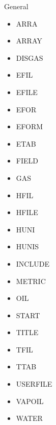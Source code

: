 \documentclass[letterpaper,10pt,english]{sphinxmanual}
\begin{document}
General
\begin{itemize}
\item {} 
ARRA

\item {} 
ARRAY

\item {} 
DISGAS

\item {} 
EFIL

\item {} 
EFILE

\item {} 
EFOR

\item {} 
EFORM

\item {} 
ETAB

\item {} 
FIELD

\item {} 
GAS

\item {} 
HFIL

\item {} 
HFILE

\item {} 
HUNI

\item {} 
HUNIS

\item {} 
INCLUDE

\item {} 
METRIC

\item {} 
OIL

\item {} 
START

\item {} 
TITLE

\item {} 
TFIL

\item {} 
TTAB

\item {} 
USERFILE

\item {} 
VAPOIL

\item {} 
WATER

\end{itemize}
\end{document}
